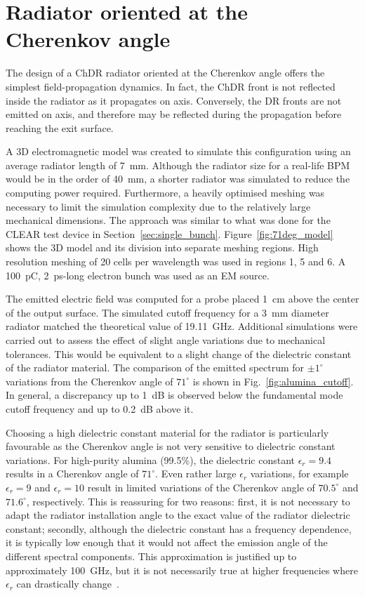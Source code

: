\section[Radiator oriented at the Cherenkov angle]{Radiator oriented at the Cherenkov angle}\label{sec:future_radiator_71}

The design of a ChDR radiator oriented at the Cherenkov angle offers the simplest field-propagation dynamics. In fact, the ChDR front is not reflected inside the radiator as it propagates on axis. Conversely, the DR fronts are not emitted on axis, and therefore may be reflected during the propagation before reaching the exit surface.

A 3D electromagnetic model was created to simulate this configuration using an average radiator length of 7~mm. Although the radiator size for a real-life BPM would be in the order of 40~mm, a shorter radiator was simulated to reduce the computing power required. Furthermore, a heavily optimised meshing was necessary to limit the simulation complexity due to the relatively large mechanical dimensions. The approach was similar to what was done for the CLEAR test device in Section~\ref{sec:single_bunch}. Figure~\ref{fig:71deg_model} shows the 3D model and its division into separate meshing regions. High resolution meshing of 20 cells per wavelength was used in regions 1, 5 and 6. A 100~pC, 2~ps-long electron bunch was used as an EM source.

The emitted electric field was computed for a probe placed 1~cm above the center of the output surface. The simulated cutoff frequency for a 3~mm diameter radiator matched the theoretical value of 19.11~GHz. Additional simulations were carried out to assess the effect of slight angle variations due to mechanical tolerances. This would be equivalent to a slight change of the dielectric constant of the radiator material. The comparison of the emitted spectrum for $\pm1^\circ$ variations from the Cherenkov angle of $71^\circ$ is shown in Fig.~\ref{fig:alumina_cutoff}. In general, a discrepancy up to 1~dB is observed below the fundamental mode cutoff frequency and up to 0.2~dB above it. 

Choosing a high dielectric constant material for the radiator is particularly favourable as the Cherenkov angle is not very sensitive to dielectric constant variations. For high-purity alumina (99.5\%), the dielectric constant $\epsilon_r=9.4$ results in a Cherenkov angle of $71^\circ$. Even rather large $\epsilon_r$ variations, for example $\epsilon_r = 9$ and $\epsilon_r = 10$ result in limited variations of the Cherenkov angle of $70.5^\circ$ and $71.6^\circ$, respectively. This is reassuring for two reasons: first, it is not necessary to adapt the radiator installation angle to the exact value of the radiator dielectric constant; secondly, although the dielectric constant has a frequency dependence, it is typically low enough that it would not affect the emission angle of the different spectral components. This approximation is justified up to approximately 100~GHz, but it is not necessarily true at higher frequencies where $\epsilon_r$ can drastically change~\cite{epsilon_r_THz}.

